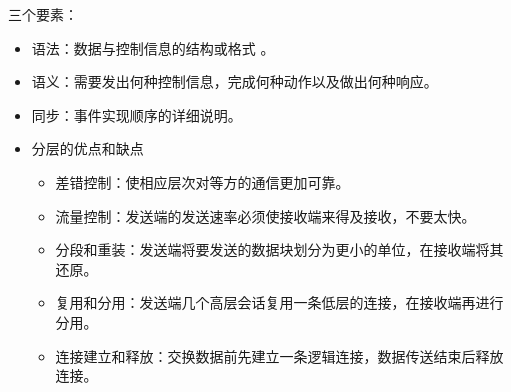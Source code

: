 \documentclass[11pt]{article}
\begin{document}
三个要素：
\begin{itemize}
\item 语法：数据与控制信息的结构或格式 。
\item 语义：需要发出何种控制信息，完成何种动作以及做出何种响应。
\item 同步：事件实现顺序的详细说明。

\item 分层的优点和缺点

\begin{itemize}
\item 差错控制：使相应层次对等方的通信更加可靠。

\item 流量控制：发送端的发送速率必须使接收端来得及接收，不要太快。

\item 分段和重装：发送端将要发送的数据块划分为更小的单位，在接收端将其还原。

\item 复用和分用：发送端几个高层会话复用一条低层的连接，在接收端再进行分用。

\item 连接建立和释放：交换数据前先建立一条逻辑连接，数据传送结束后释放连接。
\end{itemize}
\end{itemize}
\end{document}
